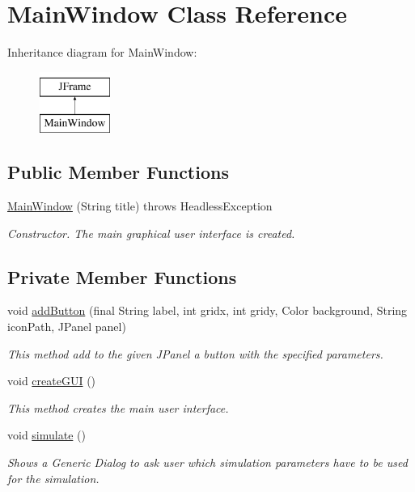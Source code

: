 \hypertarget{classgui_1_1_main_window}{}\section{Main\+Window Class Reference}
\label{classgui_1_1_main_window}
Inheritance diagram for Main\+Window\+:\begin{figure}[H]
\begin{center}
\leavevmode
\includegraphics[height=2.000000cm]{classgui_1_1_main_window}
\end{center}
\end{figure}
\subsection*{Public Member Functions}
\begin{DoxyCompactItemize}
\item 
\hyperlink{classgui_1_1_main_window_afe2ccfe7a8f33c8819567771cf151b0e}{Main\+Window} (String title)  throws Headless\+Exception 
\begin{DoxyCompactList}\small\item\em Constructor. The main graphical user interface is created. \end{DoxyCompactList}\end{DoxyCompactItemize}
\subsection*{Private Member Functions}
\begin{DoxyCompactItemize}
\item 
void \hyperlink{classgui_1_1_main_window_aef273df0357bb9cf10e8692fb49c40cb}{add\+Button} (final String label, int gridx, int gridy, Color background, String icon\+Path, J\+Panel panel)
\begin{DoxyCompactList}\small\item\em This method add to the given J\+Panel a button with the specified parameters. \end{DoxyCompactList}\item 
void \hyperlink{classgui_1_1_main_window_ae3700d532c2ae5e2171016e13584b2d6}{create\+G\+UI} ()
\begin{DoxyCompactList}\small\item\em This method creates the main user interface. \end{DoxyCompactList}\item 
void \hyperlink{classgui_1_1_main_window_a1f451daf160cbacfab1e7b495789750e}{simulate} ()
\begin{DoxyCompactList}\small\item\em Shows a Generic Dialog to ask user which simulation parameters have to be used for the simulation. \end{DoxyCompactList}\end{DoxyCompactItemize}
